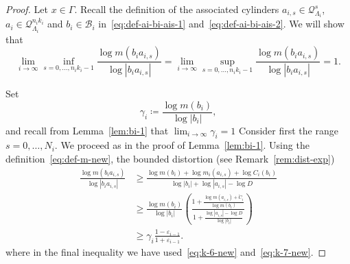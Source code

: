 \documentclass[english, 10pt]{amsart}
\numberwithin{equation}{section}
\theoremstyle{definition}
\theoremstyle{plain}
\theoremstyle{plain}
\theoremstyle{definition}
\theoremstyle{definition}
\theoremstyle{plain}
\theoremstyle{definition}
\newcommand{\eps}{\varepsilon}
\newcommand{\cB}{{\mathcal B}}
\newcommand{\cQ}{{\mathcal Q}}
\newcommand{\eqdef}{\coloneqq}
\numberwithin{equation}{section}
\begin{document}
\begin{proof}
   Let $x\in \Gamma$. 
  Recall the definition of the associated cylinders $a_{i,s} \in \cQ_{\Lambda_i}^{s}$, $a_{i}\in \cQ_{\Lambda_i}^{n_ik_i}$ and $b_i\in \cB_i$ in~\eqref{eq:def-ai-bi-ais-1} and~\eqref{eq:def-ai-bi-ais-2}.
  We will show that
  \begin{equation}\label{eq:dim-claim}
    \lim_{i\to\infty}
    \inf_{s = 0 ,\ldots, n_i k_i - 1} \frac{ \log m ( b_i a_{i,s} ) }{ \log |b_i a_{i,s} |}
    =
    \lim_{ i \to \infty }\sup_{s = 0 ,\ldots, n_i k_i - 1} \frac{ \log m ( b_i a_{i,s} ) }{ \log |b_i a_{i,s} |}
    = 1.
  \end{equation}

  Set
  \[
    \gamma_i \eqdef \frac{ \log m (b_i)} { \log |b_i|},
  \]
  and recall from Lemma~\ref{lem:bi-1} that $\lim_{i\to\infty} \gamma_i = 1$
  Consider first the range $s = 0, \ldots, N_i$.
  We proceed as in the proof of Lemma~\ref{lem:bi-1}.
  Using the definition~\eqref{eq:def-m-new}, the bounded distortion (see Remark~\ref{rem:dist-exp})
  \begin{align}
    \nonumber
    \frac{
      \log m ( b_i a_{i,s})
    }
    {
      \log |b_i a_{i,s}|
    }
    &\ge 
    \frac{ \log m ( b_i ) + \log m_i (a_{i,s}) + \log C_i (b_i) }
    { \log |b_{i}|  + \log |a_{i,s}| - \log D } \\
    \nonumber
    &\ge
    \frac{ \log m  (b_i) }{ \log |b_i| }
    \left(
      \frac{ 1
       + \frac{ \log m ( a_{i,s} ) + \widetilde C_{i} }{ \log m (b_i) }
      }{ 1
       + \frac{ \log |a_{i,s}| - \log D }{ \log |b_i|}
      }
    \right) \\
    \label{eq:dim-s-small}
  &\ge
  \gamma_i \frac{ 1 - \eps_{ i - 1} }{ 1 + \eps_{ i - 1 } }.
  \end{align}
  where in the final inequality we have
  used~\eqref{eq:k-6-new} and~\eqref{eq:k-7-new}.


\end{proof}
\end{document}
